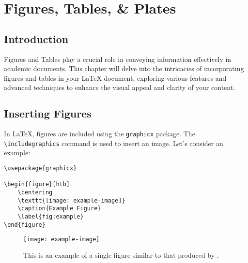 \chapter{Figures, Tables, \& Plates}
	\section{Introduction}
		Figures and Tables play a crucial role in conveying information effectively in academic documents. 
		This chapter will delve into the intricacies of incorporating figures and tables in your LaTeX document, exploring various features and advanced techniques to enhance the visual appeal and clarity of your content.



	\section{Inserting Figures}
		In \LaTeX, figures are included using the \texttt{graphicx} package. 
		The \lstinline|\includegraphics| command is used to insert an image. 
		Let's consider an example:

		\begin{lstlisting}[float=ht,caption=A Basic Example of Including a Figure.,label=lst:figureExample,style=LaTeXStyle,basicstyle=\small\ttfamily,]
\usepackage{graphicx}

\begin{figure}[htb]
	\centering
	\texttt{[image: example-image]}
	\caption{Example Figure}
	\label{fig:example}
\end{figure}
		\end{lstlisting}

		\begin{figure}[H]
			\centering
			\texttt{[image: example-image]}
			\caption{This is an example of a single figure similar to that produced by .}
			\label{fig:singleImage}
		\end{figure}

